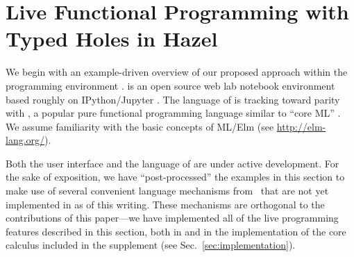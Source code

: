 \newcommand{\examplesSec}{Live Functional Programming with Typed Holes in Hazel}
\section{\protect\examplesSec} %
\label{sec:examples}




\newcommand{\overviewExample}[2]{\paragraph{Example {#1}: {#2}}}

We begin with an example-driven overview of our proposed approach  within the \Hazel programming environment \citet{HazelnutSNAPL}. \Hazel is an open source web lab notebook environment based roughly on IPython/Jupyter \cite{Perez:2007:ISI:1251563.1251831}. The language of \Hazel is tracking toward parity with \Elm, a popular pure functional programming language similar to ``core ML'' \cite{czaplicki2012elm,Elm}. We assume familiarity with the basic concepts of ML/Elm (see \url{http://elm-lang.org/}).

Both the user interface and the language of \Hazel are under active development. For the sake of 
exposition, we have ``post-processed'' the examples in this section to make use of several convenient language mechanisms from \Elm~that are not yet implemented in \Hazel as of this writing. These mechanisms are orthogonal to the contributions of this paper---we have implemented all of the live programming features described in this section, both in \Hazel and in the implementation of the core calculus included in the supplement (see Sec.~\ref{sec:implementation}).








